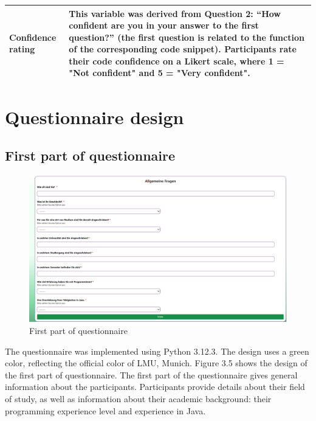\begin{longtable}{|p{5.5cm}|p{8.5cm}|}
\parbox[t]{5.5cm}{\vspace{0.3em}Confidence rating\vspace{0.5em}} &
\parbox[t]{8.5cm}{\vspace{0.3em}This variable was derived from Question 2: “How confident are you in your answer to the first question?” (the first question is related to the function of the corresponding code snippet). Participants rate their code confidence on a Likert scale, where 1 = "Not confident" and 5 = "Very confident".\vspace{0.5em}} \\
\hline

\end{longtable}


\section{Questionnaire design}


\subsection{First part of questionnaire}


\begin{figure} [H]
  \centering
  \includegraphics[scale=0.45]{figures/allgemein.png}
  \caption{First part of questionnaire}
  \label{fig:AnhangsChor}
\end{figure}

The questionnaire was implemented using Python 3.12.3.  The  design uses a green color, reflecting the official color of LMU, Munich. 
Figure 3.5 shows the design of the first part of questionnaire. The first part of the questionnaire gives general information about the participants. 
Participants provide details about their field of study, as well as information about their academic background: their programming experience level and experience in Java. 



